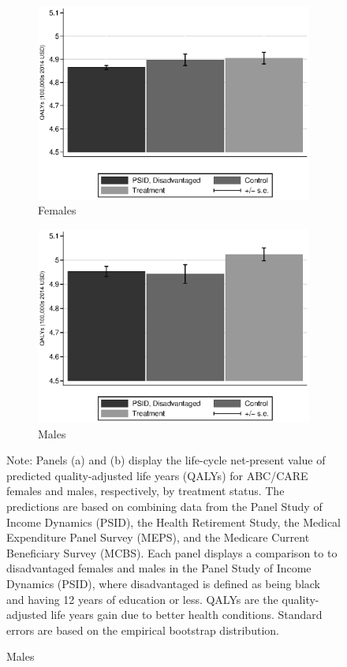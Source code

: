 \begin{figure}
\centering
\caption{Quality Adjusted Life Years, Predictions and Comparison to PSID}\label{fig:qalys}
\begin{subfigure}[h]{0.5\textwidth}
		\centering
		\caption{Females} \label{fig:qabcare1}
		\includegraphics[width=\textwidth]{output/qalyexppsid_0.eps}
\end{subfigure}%
\begin{subfigure}[h]{0.5\textwidth}
	\centering
	\caption{Males} \label{fig:qpsid1}
		\includegraphics[width=\textwidth]{output/qalyexppsid_1.eps}
\end{subfigure}
\footnotesize \justify
Note: Panels (a) and (b) display the life-cycle net-present value of predicted quality-adjusted life years (QALYs) for ABC/CARE females and males, respectively, by treatment status. The predictions are based on combining data from the Panel Study of Income Dynamics (PSID), the Health Retirement Study, the Medical Expenditure Panel Survey (MEPS), and the Medicare Current Beneficiary Survey (MCBS). Each panel displays a comparison to to disadvantaged females and males in the Panel Study of Income Dynamics (PSID), where disadvantaged is defined as being black and having 12 years of education or less. QALYs are the quality-adjusted life years gain due to better health conditions. Standard errors are based on the empirical bootstrap distribution.\\
\end{figure}

